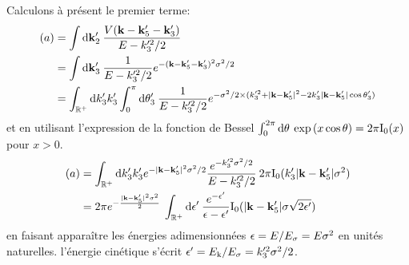 Calculons à présent le premier terme:
\begin{align}
(a)&= \int{\mathop{}\mathopen{}\mathrm{d}\mathbf{k}_{\mathrm{2}}' \: \frac{V(\mathbf{k}-\mathbf{k}_{\mathrm{5}}'-\mathbf{k}_{\mathrm{3}}')}{E-k_{\mathrm{3}}'^2/2}} \\
&= \int{\mathop{}\mathopen{}\mathrm{d}\mathbf{k}_{\mathrm{3}}' \: \frac{1}{E-k_{\mathrm{3}}'^2/2} e^{-(\mathbf{k}-\mathbf{k}_{\mathrm{5}}'-\mathbf{k}_{\mathrm{3}}')^2 \sigma^2/2}} \\
&= \int_{\mathbb{R}^+}{\mathop{}\mathopen{}\mathrm{d} k_{\mathrm{3}}' k_{\mathrm{3}}' \int_0^{\pi}{\mathop{}\mathopen{}\mathrm{d}\theta_{\mathrm{3}}'\: \frac{1}{E-k_{\mathrm{3}}'^2/2}e^{-\sigma^2/2\times (k_{\mathrm{3}}'^2+|\mathbf{k}-\mathbf{k}_{\mathrm{5}}'|^2-2k_{\mathrm{3}}' |\mathbf{k}-\mathbf{k}_{\mathrm{5}}'| \cos{\theta_{\mathrm{3}}'})}}}
\end{align}
et en utilisant l'expression de la fonction de Bessel $\int_0^{2\pi}{\mathop{}\mathopen{}\mathrm{d}\theta\:\exp{(x\cos{\theta})}} =2\pi \mathrm{I_0}(x)$ pour $x>0$.
\begin{align}
(a)&=\int_{\mathbb{R}^+}{\mathop{}\mathopen{}\mathrm{d} k_{\mathrm{3}}' k_{\mathrm{3}}' e^{-|\mathbf{k}-\mathbf{k}_{\mathrm{5}}'|^2 \sigma^2/2} \frac{e^{-k_{\mathrm{3}}'^2\sigma^2/2}}{E-k_{\mathrm{3}}'^2/2} \: 2\pi \mathrm{I_0}(k_{\mathrm{3}}' |\mathbf{k}-\mathbf{k}_{\mathrm{5}}'|\sigma^2)} \\
&= 2\pi e^{-\frac{|\mathbf{k}-\mathbf{k}_{\mathrm{5}}'|^2\sigma^2}{2}} \: \int_{\mathbb{R}^+}{\mathop{}\mathopen{}\mathrm{d}\epsilon'\:\frac{e^{-\epsilon'}}{\epsilon-\epsilon'}\mathrm{I_0}(|\mathbf{k}-\mathbf{k}_{\mathrm{5}}'|\sigma\sqrt{2\epsilon'})}
\end{align}
en faisant apparaître les énergies adimensionnées $\epsilon=E/E_{\sigma}=E\sigma^2$ en unités naturelles. l'énergie cinétique s'écrit $\epsilon'=E_{\mathrm{k}}/E_{\sigma}=k_{\mathrm{3}}'^2\sigma^2/2$.

